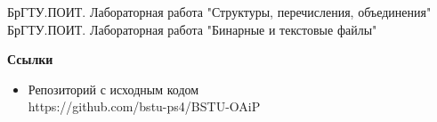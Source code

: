 \begin{thebibliography}{3}
    \bibitem{}
    БрГТУ.ПОИТ. Лабораторная работа "Структуры, перечисления, объединения"
    \bibitem{}
    БрГТУ.ПОИТ. Лабораторная работа "Бинарные и текстовые файлы"
\end{thebibliography}

\textbf{Ссылки}
\begin{itemize}
    \item Репозиторий с исходным кодом\\
    https://github.com/bstu-ps4/BSTU-OAiP
\end{itemize}